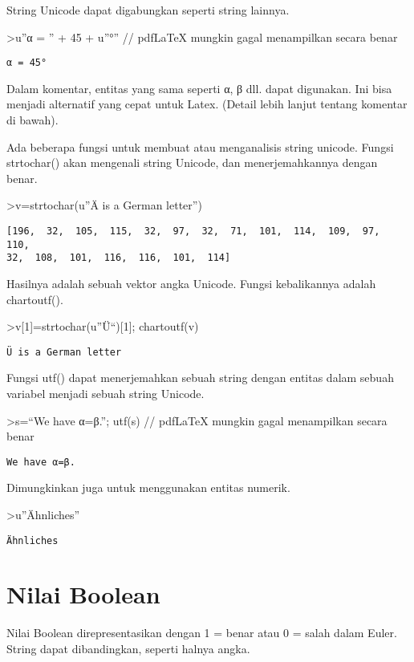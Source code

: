 \documentclass[
]{book}
\begin{document}
String Unicode dapat digabungkan seperti string lainnya.

\textgreater u''α = '' + 45 + u''°'' // pdfLaTeX mungkin gagal menampilkan secara benar

\begin{verbatim}
α = 45°
\end{verbatim}

Dalam komentar, entitas yang sama seperti α, β dll. dapat digunakan. Ini bisa menjadi alternatif yang cepat untuk Latex. (Detail lebih lanjut tentang komentar di bawah).

Ada beberapa fungsi untuk membuat atau menganalisis string unicode. Fungsi strtochar() akan mengenali string Unicode, dan menerjemahkannya dengan benar.

\textgreater v=strtochar(u''Ä is a German letter'')

\begin{verbatim}
[196,  32,  105,  115,  32,  97,  32,  71,  101,  114,  109,  97,  110,
32,  108,  101,  116,  116,  101,  114]
\end{verbatim}

Hasilnya adalah sebuah vektor angka Unicode. Fungsi kebalikannya adalah chartoutf().

\textgreater v{[}1{]}=strtochar(u''Ü``){[}1{]}; chartoutf(v)

\begin{verbatim}
Ü is a German letter
\end{verbatim}

Fungsi utf() dapat menerjemahkan sebuah string dengan entitas dalam sebuah variabel menjadi sebuah string Unicode.

\textgreater s=``We have α=β.''; utf(s) // pdfLaTeX mungkin gagal menampilkan secara benar

\begin{verbatim}
We have α=β.
\end{verbatim}

Dimungkinkan juga untuk menggunakan entitas numerik.

\textgreater u''Ähnliches''

\begin{verbatim}
Ähnliches
\end{verbatim}

\section{Nilai Boolean}\label{nilai-boolean}

Nilai Boolean direpresentasikan dengan 1 = benar atau 0 = salah dalam Euler. String dapat dibandingkan, seperti halnya angka.
\end{document}
